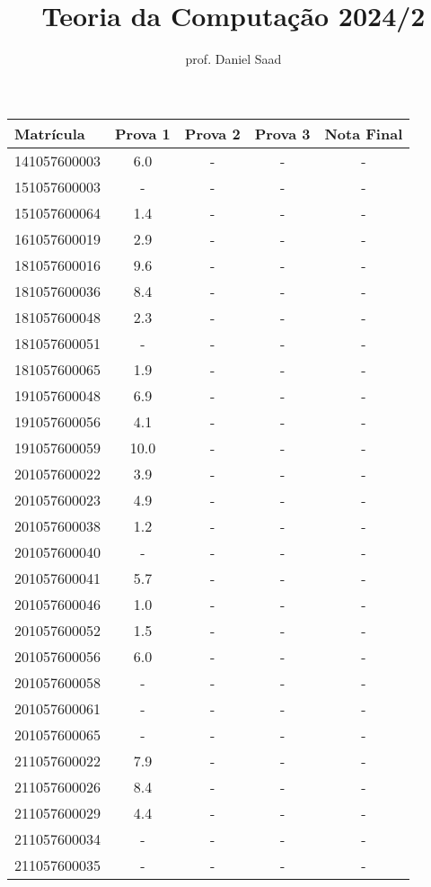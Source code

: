 \documentclass{article}
\title{ Teoria da Computação 2024/2}
\date{}
\author{ prof. Daniel Saad}
\begin{document}
 \maketitle
    \begin{longtable}{|l|c|c|c|c|}
    \hline
Matrícula & Prova 1 & Prova 2 & Prova 3 & Nota Final\\\hline \endhead   
141057600003 & 6.0 & - & - & -\\\hline
151057600003 & - & - & - & -\\\hline
151057600064 & 1.4 & - & - & -\\\hline
161057600019 & 2.9 & - & - & -\\\hline
181057600016 & 9.6 & - & - & -\\\hline
181057600036 & 8.4 & - & - & -\\\hline
181057600048 & 2.3 & - & - & -\\\hline
181057600051 & - & - & - & -\\\hline
181057600065 & 1.9 & - & - & -\\\hline
191057600048 & 6.9 & - & - & -\\\hline
191057600056 & 4.1 & - & - & -\\\hline
191057600059 & 10.0 & - & - & -\\\hline
201057600022 & 3.9 & - & - & -\\\hline
201057600023 & 4.9 & - & - & -\\\hline
201057600038 & 1.2 & - & - & -\\\hline
201057600040 & - & - & - & -\\\hline
201057600041 & 5.7 & - & - & -\\\hline
201057600046 & 1.0 & - & - & -\\\hline
201057600052 & 1.5 & - & - & -\\\hline
201057600056 & 6.0 & - & - & -\\\hline
201057600058 & - & - & - & -\\\hline
201057600061 & - & - & - & -\\\hline
201057600065 & - & - & - & -\\\hline
211057600022 & 7.9 & - & - & -\\\hline
211057600026 & 8.4 & - & - & -\\\hline
211057600029 & 4.4 & - & - & -\\\hline
211057600034 & - & - & - & -\\\hline
211057600035 & - & - & - & -\\\hline

\end{longtable}
\end{document}

